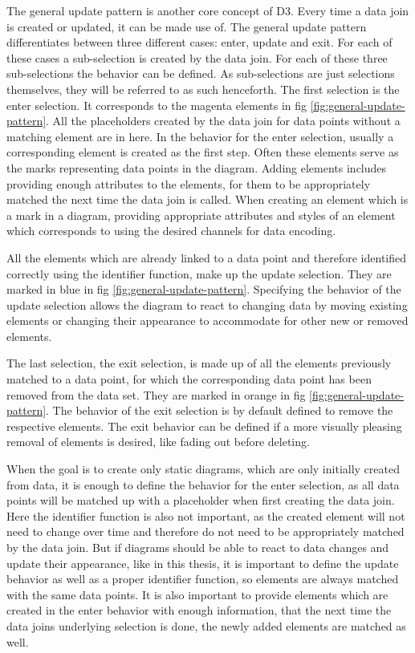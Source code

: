 The general update pattern is another core concept of D3. Every time a data join is created or updated, it can be made use of. The general update pattern differentiates between three different cases: enter, update and exit. For each of these cases a sub-selection is created by the data join. For each of these three sub-selections the behavior can be defined. As sub-selections are just selections themselves, they will be referred to as such henceforth. The first selection is the enter selection. It corresponds to the magenta elements in fig \ref{fig:general-update-pattern}. All the placeholders created by the data join for data points without a matching element are in here. In the behavior for the enter selection, usually a corresponding element is created as the first step. Often these elements serve as the marks representing data points in the diagram. Adding elements includes providing enough attributes to the elements, for them to be appropriately matched the next time the data join is called. When creating an element which is a mark in a diagram, providing appropriate attributes and styles of an element which corresponds to using the desired channels for data encoding.

All the elements which are already linked to a data point and therefore identified correctly using the identifier function, make up the update selection. They are marked in blue in fig \ref{fig:general-update-pattern}. Specifying the behavior of the update selection allows the diagram to react to changing data by moving existing elements or changing their appearance to accommodate for other new or removed elements.

The last selection, the exit selection, is made up of all the elements previously matched to a data point, for which the corresponding data point has been removed from the data set. They are marked in orange in fig \ref{fig:general-update-pattern}. The behavior of the exit selection is by default defined to remove the respective elements. The exit behavior can be defined if a more visually pleasing removal of elements is desired, like fading out before deleting.

When the goal is to create only static diagrams, which are only initially created from data, it is enough to define the behavior for the enter selection, as all data points will be matched up with a placeholder when first creating the data join. Here the identifier function is also not important, as the created element will not need to change over time and therefore do not need to be appropriately matched by the data join. But if diagrams should be able to react to data changes and update their appearance, like in this thesis, it is important to define the update behavior as well as a proper identifier function, so elements are always matched with the same data points. It is also important to provide elements which are created in the enter behavior with enough information, that the next time the data joins underlying selection is done, the newly added elements are matched as well.


